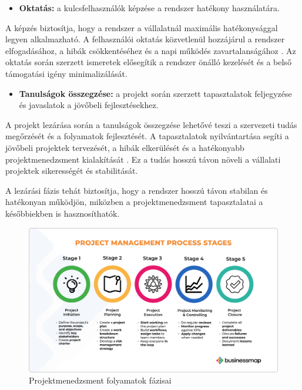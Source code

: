 \begin{itemize}
    \item \textbf{Oktatás:} a kulcsfelhasználók képzése a rendszer hatékony használatára.
\end{itemize}

A képzés biztosítja, hogy a rendszer a vállalatnál maximális hatékonysággal legyen alkalmazható. 
A felhasználói oktatás közvetlenül hozzájárul a rendszer elfogadásához, 
a hibák csökkentéséhez és a napi működés zavartalanságához \cite{Szalay2018,Kovacs2016}. 
Az oktatás során szerzett ismeretek elősegítik a rendszer önálló kezelését és a belső támogatási igény minimalizálását.

\begin{itemize}
    \item \textbf{Tanulságok összegzése:} a projekt során szerzett tapasztalatok feljegyzése és javaslatok a jövőbeli fejlesztésekhez.
\end{itemize}

A projekt lezárása során a tanulságok összegzése lehetővé teszi a szervezeti tudás megőrzését és a folyamatok fejlesztését. 
A tapasztalatok nyilvántartása segíti a jövőbeli projektek tervezését, a hibák elkerülését 
és a hatékonyabb projektmenedzsment kialakítását \cite{Hajdu2014,Szalay2018,Kaposi2019}. 
Ez a tudás hosszú távon növeli a vállalati projektek sikerességét és stabilitását.

A lezárási fázis tehát biztosítja, hogy a rendszer hosszú távon stabilan és hatékonyan működjön, 
miközben a projektmenedzsment tapasztalatai a későbbiekben is hasznosíthatók.

\begin{figure}[H]
    \centering
    \includegraphics[width=130mm, keepaspectratio]{figures/project_management_process_stages.png}
    \caption{Projektmenedzsment folyamatok fázisai}
    \label{fig:project_management_process_stages}
\end{figure}
